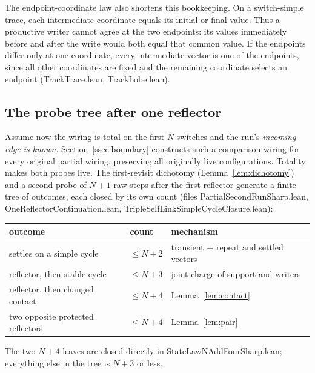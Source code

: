 \documentclass[11pt]{article}
\theoremstyle{definition}
\newcommand{\file}[1]{\textsf{#1}}
\begin{document}
The endpoint-coordinate law also shortens this bookkeeping. On a
switch-simple trace, each intermediate coordinate equals its initial or final
value. Thus a productive writer cannot agree at the two endpoints: its values
immediately before and after the write would both equal that common value.
If the endpoints differ only at one coordinate, every intermediate vector is
one of the endpoints, since all other coordinates are fixed and the remaining
coordinate selects an endpoint
(\file{TrackTrace.lean}, \file{TrackLobe.lean}).

\subsection{The probe tree after one reflector}\label{ssec:probe}

Assume now the wiring is total on the first $N$ switches and the run's
\emph{incoming edge is known}. Section~\ref{ssec:boundary} constructs
such a comparison wiring for every original partial wiring, preserving
all originally live configurations. Totality makes both probes live.  The first-revisit dichotomy
(Lemma~\ref{lem:dichotomy}) and a second probe of $N+1$ raw steps after
the first reflector generate a finite tree of outcomes, each closed by
its own count (files \file{PartialSecondRunSharp.lean},
\file{OneReflectorContinuation.lean},
\file{TripleSelfLinkSimpleCycleClosure.lean}):

\begin{center}
\begin{tabular}{lll}
  \toprule
  outcome & count & mechanism\\
  \midrule
  settles on a simple cycle & $\le N+2$ &
    transient $+$ repeat and settled vectors\\
  reflector, then stable cycle & $\le N+3$ &
    joint charge of support and writers\\
  reflector, then changed contact & $\le N+4$ & Lemma~\ref{lem:contact}\\
  two opposite protected reflectors & $\le N+4$ & Lemma~\ref{lem:pair}\\
  \bottomrule
\end{tabular}
\end{center}

The two $N+4$ leaves are closed directly in
\file{StateLawNAddFourSharp.lean}; everything else in the tree is
$N+3$ or less.
\end{document}
